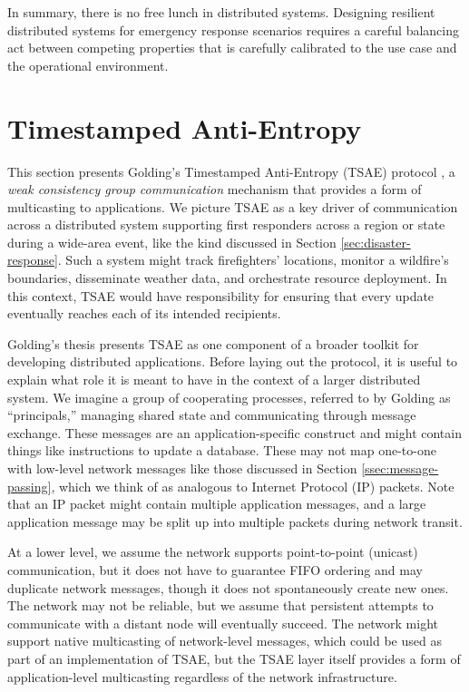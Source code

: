 \documentclass[]             %
{NASA}                       %
\theoremstyle{definition}
\begin{document}
In summary, there is no free lunch in distributed systems. Designing
resilient distributed systems for emergency response scenarios
requires a careful balancing act between competing properties that is
carefully calibrated to the use case and the operational environment.


\section{Timestamped Anti-Entropy}
\label{sec:tsae}
This section presents Golding's Timestamped Anti-Entropy (TSAE)
protocol \cite{1992:golding-thesis}, a \emph{weak consistency group
  communication} mechanism that provides a form of multicasting to
applications. We picture TSAE as a key driver of communication across
a distributed system supporting first responders across a region or
state during a wide-area event, like the kind discussed in Section
\ref{sec:disaster-response}. Such a system might track firefighters'
locations, monitor a wildfire's boundaries, disseminate weather data,
and orchestrate resource deployment. In this context, TSAE would have
responsibility for ensuring that every update eventually reaches each
of its intended recipients.

Golding's thesis \cite{1992:golding-thesis} presents TSAE as one
component of a broader toolkit for developing distributed
applications. Before laying out the protocol, it is useful to explain
what role it is meant to have in the context of a larger distributed
system. We imagine a group of cooperating processes, referred to by
Golding as ``principals,'' managing shared state and communicating
through message exchange. These messages are an application-specific
construct and might contain things like instructions to update a
database. These may not map one-to-one with low-level network messages
like those discussed in Section \ref{ssec:message-passing}, which we
think of as analogous to Internet Protocol (IP) packets. Note that an
IP packet might contain multiple application messages, and a large
application message may be split up into multiple packets during
network transit.

At a lower level, we assume the network supports point-to-point
(unicast) communication, but it does not have to guarantee FIFO
ordering and may duplicate network messages, though it does not
spontaneously create new ones. The network may not be reliable, but we
assume that persistent attempts to communicate with a distant node
will eventually succeed. The network might support native multicasting
of network-level messages, which could be used as part of an
implementation of TSAE, but the TSAE layer itself provides a form of
application-level multicasting regardless of the network
infrastructure.
\end{document}
